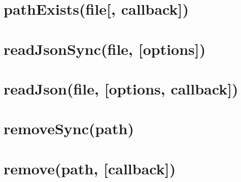 \documentclass[twoside]{book}
\newcommand{\+}{\discretionary{\mbox{\scriptsize$\hookleftarrow$}}{}{}}
\begin{document}
\chapter{path\+Exists(file\mbox{[}, callback\mbox{]})}
\label{md_dsmacc_examples_DRmerge_node_modules_electron-packager_node_modules_electron-download_node_modules_fs-extra_docs_pathExists}

\chapter{read\+Json\+Sync(file, \mbox{[}options\mbox{]})}
\label{md_dsmacc_examples_DRmerge_node_modules_electron-packager_node_modules_electron-download_node_moed70252ffd7ba7e5ae7a4caeeda9bedd}

\chapter{read\+Json(file, \mbox{[}options, callback\mbox{]})}
\label{md_dsmacc_examples_DRmerge_node_modules_electron-packager_node_modules_electron-download_node_modules_fs-extra_docs_readJson}

\chapter{remove\+Sync(path)}
\label{md_dsmacc_examples_DRmerge_node_modules_electron-packager_node_modules_electron-download_node_modules_fs-extra_docs_remove-sync}

\chapter{remove(path, \mbox{[}callback\mbox{]})}
\label{md_dsmacc_examples_DRmerge_node_modules_electron-packager_node_modules_electron-download_node_modules_fs-extra_docs_remove}

\end{document}
